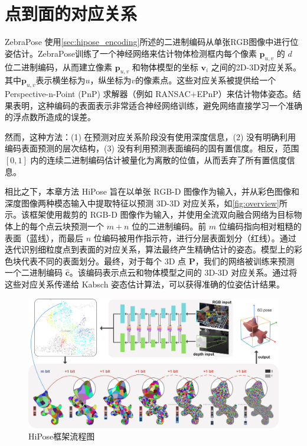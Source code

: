 \section{点到面的对应关系}

ZebraPose\cite{su2022zebrapose} 使用\autoref{sec:hipose_encoding}所述的二进制编码从单张RGB图像中进行位姿估计。ZebraPose训练了一个神经网络来估计物体检测框内每个像素 $\mathbf{p}_{u,v}$ 的 $d$ 位二进制编码，从而建立像素 $\mathbf{p}_{u,v}$ 和物体模型的坐标 $\mathbf{v}_{i}$ 之间的2D-3D对应关系。其中$\mathbf{p}_{u,v}$表示横坐标为$u$，纵坐标为$v$的像素点。这些对应关系被提供给一个Perspective-n-Point (PnP) 求解器（例如 RANSAC+EPnP\cite{lepetit2009ep}）来估计物体姿态。结果表明，这种编码的表面表示非常适合神经网络训练，避免网络直接学习一个准确的浮点数所造成的误差。

然而，这种方法：(1) 在预测对应关系阶段没有使用深度信息，(2) 没有明确利用编码表面预测的层次结构，(3) 没有利用预测表面编码的固有置信度。相反，范围 $[0,1]$ 内的连续二进制编码估计被量化为离散的位值，从而丢弃了所有置信度信息。

相比之下，本章方法 HiPose 旨在以单张 RGB-D 图像作为输入，并从彩色图像和深度图像两种模态输入中提取特征以预测 3D-3D 对应关系，如\autoref{fig:overview}所示。该框架使用裁剪的 RGB-D 图像作为输入，并使用全流双向融合网络为目标物体上的每个点云块预测一个 $m+n$ 位的二进制编码。前 $m$ 位编码指向相对粗糙的表面（蓝线），而最后 $n$ 位编码被用作指示符，进行分层表面划分（红线）。通过迭代识别细粒度点到表面的对应关系，算法最终产生精确估计的姿态。模型上的彩色块代表不同的表面划分。最终，对于每个 3D 点 $\mathbf{P}$，我们的网络被训练来预测一个二进制编码 $\hat{\mathbf{c}}$。该编码表示点云和物体模型之间的 3D-3D 对应关系。通过将这些对应关系传递给 Kabsch 姿态估计算法\cite{umeyama1991least}，可以获得准确的位姿估计结果。

\begin{figure}[ht]
    \centering
    \includegraphics[width=\textwidth]{figure/hipose/overview.png}
    \caption{HiPose框架流程图}
    \label{fig:overview}
\end{figure}

